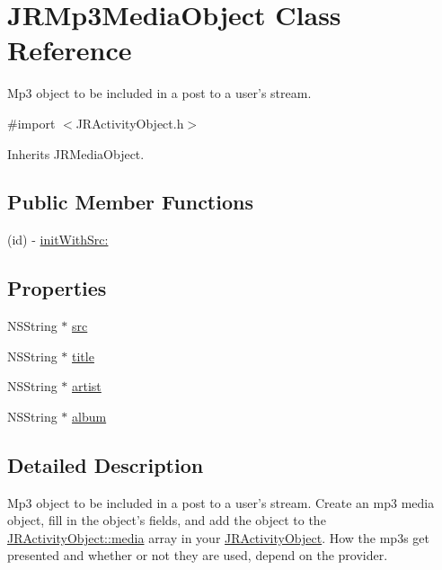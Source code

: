\hypertarget{interface_j_r_mp3_media_object}{
\section{JRMp3MediaObject Class Reference}
\label{interface_j_r_mp3_media_object}
}


Mp3 object to be included in a post to a user's stream.  




{\ttfamily \#import $<$JRActivityObject.h$>$}



Inherits JRMediaObject.

\subsection*{Public Member Functions}
\begin{DoxyCompactItemize}
\item 
(id) -\/ \hyperlink{interface_j_r_mp3_media_object_a15eba85b9094d28d8d9bc6b9625ee55c}{initWithSrc:}
\end{DoxyCompactItemize}
\subsection*{Properties}
\begin{DoxyCompactItemize}
\item 
NSString $\ast$ \hyperlink{interface_j_r_mp3_media_object_ae6ae676c1841834aba74a2c5d11cb54c}{src}
\item 
NSString $\ast$ \hyperlink{interface_j_r_mp3_media_object_accd252e22f704fd4b314217317f0b5cb}{title}
\item 
NSString $\ast$ \hyperlink{interface_j_r_mp3_media_object_aa164b3ecc14b03d36f5093d3d4d7f5b1}{artist}
\item 
NSString $\ast$ \hyperlink{interface_j_r_mp3_media_object_adefc6578183aa09a492b229696f581df}{album}
\end{DoxyCompactItemize}


\subsection{Detailed Description}
Mp3 object to be included in a post to a user's stream. Create an mp3 media object, fill in the object's fields, and add the object to the \hyperlink{interface_j_r_activity_object_a2e4ff78f83d0f353f8e0c17ed48ce0ab}{JRActivityObject::media} array in your \hyperlink{interface_j_r_activity_object}{JRActivityObject}. How the mp3s get presented and whether or not they are used, depend on the provider.

